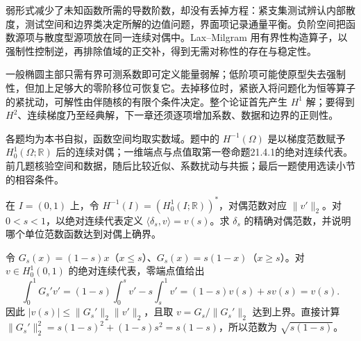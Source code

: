 



\begin{chaptersummary}
弱形式减少了未知函数所需的导数阶数，却没有丢掉方程：紧支集测试辨认内部散度，测试空间和边界类决定所解的边值问题，界面项记录通量平衡。负阶空间把函数源项与散度型源项放在同一连续对偶中。Lax--Milgram 用有界性构造算子，以强制性控制逆，再排除值域的正交补，得到无需对称性的存在与稳定性。

\ProseParagraphBreak

一般椭圆主部只需有界可测系数即可定义能量弱解；低阶项可能使原型失去强制性，但加上足够大的零阶移位可恢复它。去掉移位时，紧嵌入将问题化为恒等算子的紧扰动，可解性由伴随核的有限个条件决定。整个论证首先产生 \(H^1\) 解；要得到 \(H^2\)、连续梯度乃至经典解，下一章还须逐项增加系数、数据和边界的正则性。
\end{chaptersummary}


\BookExercises

各题均为本书自拟，函数空间均取实数域。题中的 \(H^{-1}(\Omega)\) 是以梯度范数赋予 \(H_0^1(\Omega;\mathbb R)\) 后的连续对偶；一维端点与点值取第一卷命题21.4.1的绝对连续代表。前几题核验空间和数据，随后比较近似、系数扰动与共振；最后一题使用选读小节的相容条件。

\begin{exercise}\label{b2:ex:15-point-source}
在 \(I=(0,1)\) 上，令 \(H^{-1}(I)=(H_0^1(I;\mathbb R))^*\)，对偶范数对应 \(\|v'\|_2\)。对 \(0<s<1\)，以绝对连续代表定义 \(\langle\delta_s,v\rangle=v(s)\)。求 \(\delta_s\) 的精确对偶范数，并说明哪个单位范数函数达到对偶上确界。
\end{exercise}
\begin{solution}
令 \(G_s(x)=(1-s)x\)（\(x\le s\)）、\(G_s(x)=s(1-x)\)（\(x\ge s\)）。对 \(v\in H_0^1(0,1)\) 的绝对连续代表，零端点值给出
\[
 \int_0^1G_s'v'=(1-s)\int_0^sv'-s\int_s^1v'
 =(1-s)v(s)+sv(s)=v(s).
\]
因此 \(|v(s)|\le\lVert G_s'\rVert_2\lVert v'\rVert_2\)，且取 \(v=G_s/\lVert G_s'\rVert_2\) 达到上界。直接计算 \(\lVert G_s'\rVert_2^2=s(1-s)^2+(1-s)s^2=s(1-s)\)，所以范数为 \(\sqrt{s(1-s)}\)。
\end{solution}

